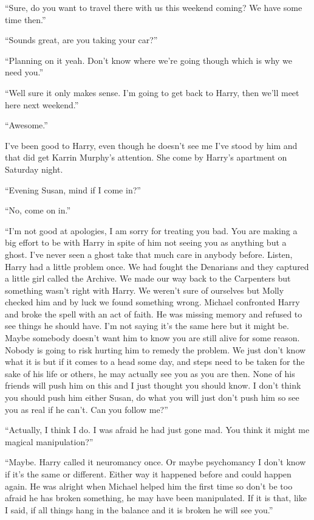 ``Sure, do you want to travel there with us this weekend coming? We have some time then.''

``Sounds great, are you taking your car?''

``Planning on it yeah. Don't know where we're going though which is why we need you.''

``Well sure it only makes sense. I'm going to get back to Harry, then we'll meet here next weekend.''

``Awesome.''

I've been good to Harry, even though he doesn't see me I've stood by him and that did get Karrin Murphy's attention. She come by Harry's apartment on Saturday night.

``Evening Susan, mind if I come in?''

``No, come on in.''

``I'm not good at apologies, I am sorry for treating you bad. You are making a big effort to be with Harry in spite of him not seeing you as anything but a ghost. I've never seen a ghost take that much care in anybody before. Listen, Harry had a little problem once. We had fought the Denarians and they captured a little girl called the Archive. We made our way back to the Carpenters but something wasn't right with Harry. We weren't sure of ourselves but Molly checked him and by luck we found something wrong. Michael confronted Harry and broke the spell with an act of faith. He was missing memory and refused to see things he should have. I'm not saying it's the same here but it might be. Maybe somebody doesn't want him to know you are still alive for some reason. Nobody is going to risk hurting him to remedy the problem. We just don't know what it is but if it comes to a head some day, and steps need to be taken for the sake of his life or others, he may actually see you as you are then. None of his friends will push him on this and I just thought you should know. I don't think you should push him either Susan, do what you will just don't push him so see you as real if he can't. Can you follow me?''

``Actually, I think I do. I was afraid he had just gone mad. You think it might me magical manipulation?''

``Maybe. Harry called it neuromancy once. Or maybe psychomancy I don't know if it's the same or different. Either way it happened before and could happen again. He was alright when Michael helped him the first time so don't be too afraid he has broken something, he may have been manipulated. If it is that, like I said, if all things hang in the balance and it is broken he will see you.''

